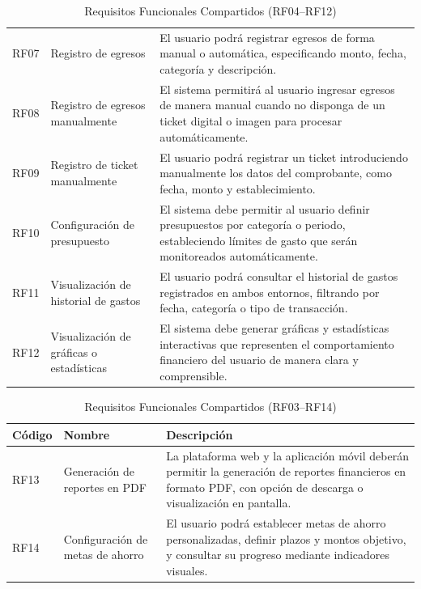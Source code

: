 \begin{itemize}
\begin{table}[H]
\begin{tabularx}{\textwidth}{@{} l l X @{}}
    RF07 & Registro de egresos &
    El usuario podrá registrar egresos de forma manual o automática, especificando monto, fecha, categoría y descripción. \\

    RF08 & Registro de egresos manualmente &
    El sistema permitirá al usuario ingresar egresos de manera manual cuando no disponga de un ticket digital o imagen para procesar automáticamente. \\

    RF09 & Registro de ticket manualmente &
    El usuario podrá registrar un ticket introduciendo manualmente los datos del comprobante, como fecha, monto y establecimiento. \\

    RF10 & Configuración de presupuesto &
    El sistema debe permitir al usuario definir presupuestos por categoría o periodo, estableciendo límites de gasto que serán monitoreados automáticamente. \\

    RF11 & Visualización de historial de gastos &
    El usuario podrá consultar el historial de gastos registrados en ambos entornos, filtrando por fecha, categoría o tipo de transacción. \\

    RF12 & Visualización de gráficas o estadísticas &
    El sistema debe generar gráficas y estadísticas interactivas que representen el comportamiento financiero del usuario de manera clara y comprensible. \\

    \bottomrule
    \end{tabularx}
    \caption{Requisitos Funcionales Compartidos (RF04–RF12)}
    \end{table}

    \begin{table}[H]
    \centering
    \renewcommand{\arraystretch}{1.2}
    \begin{tabularx}{\textwidth}{@{} l l X @{}}
    \toprule
    \textbf{Código} & \textbf{Nombre} & \textbf{Descripción} \\
    \midrule
    RF13 & Generación de reportes en PDF &
    La plataforma web y la aplicación móvil deberán permitir la generación de reportes financieros en formato PDF, con opción de descarga o visualización en pantalla. \\

    RF14 & Configuración de metas de ahorro &
    El usuario podrá establecer metas de ahorro personalizadas, definir plazos y montos objetivo, y consultar su progreso mediante indicadores visuales. \\
    \bottomrule
    \end{tabularx}
    \caption{Requisitos Funcionales Compartidos (RF03–RF14)}
    \end{table}


\end{itemize}
